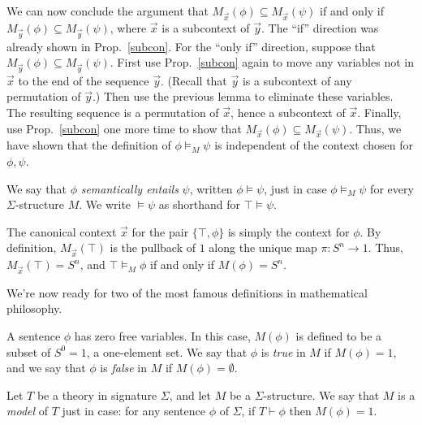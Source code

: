 We can now conclude the argument that
$M_{\vec{x}}(\phi )\subseteq M_{\vec{x}}(\psi )$ if and only if
$M_{\vec{y}}(\phi )\subseteq M_{\vec{y}}(\psi )$, where $\vec{x}$ is a
subcontext of $\vec{y}$.  The ``if'' direction was already shown in
Prop.\ \ref{subcon}.  For the ``only if'' direction, suppose that
$M_{\vec{y}}(\phi )\subseteq M_{\vec{y}}(\psi )$.  First use Prop.\
\ref{subcon} again to move any variables not in $\vec{x}$ to the end
of the sequence $\vec{y}$.  (Recall that $\vec{y}$ is a subcontext of
any permutation of $\vec{y}$.)  Then use the previous lemma to
eliminate these variables.  The resulting sequence is a permutation of
$\vec{x}$, hence a subcontext of $\vec{x}$.  Finally, use Prop.\
\ref{subcon} one more time to show that
$M_{\vec{x}}(\phi )\subseteq M_{\vec{x}}(\psi )$.  Thus, we have shown
that the definition of $\phi\vDash _M\psi$ is independent of the
context chosen for $\phi ,\psi$.


\begin{defn} We say that $\phi$ \emph{semantically entails} $\psi$,
  written $\phi\vDash\psi$, just in case $\phi \vDash _M\psi$ for
  every $\Sigma$-structure $M$.  We write $\vDash \psi$ as
  shorthand for $\top\vDash\psi$.  \label{entailment} \end{defn}

\begin{note} The canonical context $\vec{x}$ for the pair
  $\{\top ,\phi \}$ is simply the context for $\phi$.  By definition,
  $M_{\vec{x}}(\top )$ is the pullback of $1$ along the unique map
  $\pi :S^n\to 1$.  Thus, $M_{\vec{x}}(\top )=S^n$, and
  $\top\vDash _M\phi$ if and only if $M(\phi )=S^n$.
  \end{note}

We're now ready for two of the most famous definitions in
mathematical philosophy.

\begin{box-thm}
  A sentence $\phi$ has zero free variables.  In this case, $M(\phi )$
  is defined to be a subset of $S^0=1$, a one-element set.  We say
  that $\phi$ is \emph{true} in $M$ if $M(\phi )=1$, and we say that
  $\phi$ is \emph{false} in $M$ if $M(\phi
  )=\emptyset$.  \end{box-thm}

\begin{box-thm}[Model] Let $T$ be a theory in signature $\Sigma$, and
  let $M$ be a $\Sigma$-structure.  We say that $M$ is a \emph{model}
  of $T$ just in case: for any sentence $\phi$ of $\Sigma$, if
  $T\vdash\phi$ then $M(\phi )=1$. \end{box-thm}


